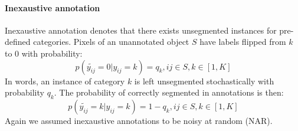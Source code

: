 \noindent
\paragraph{Inexaustive annotation}
Inexaustive annotation denotes that there exists unsegmented instances for pre-defined categories.
Pixels of an unannotated object $S$ have labels flipped from $k$ to $0$ with probability:
$$p(\tilde{y_{ij}}=0\vert y_{ij}=k) = q_k, ij \in S, k \in [1,K]$$
In words, an instance of category $k$ is left unsegmented stochastically with probability $q_k$.
The probability of correctly segmented in annotations is then:
$$p(\tilde{y_{ij}}=k\vert y_{ij}=k) = 1-q_k, ij \in S, k \in [1,K]$$
Again we assumed inexaustive annotations to be noisy at random (NAR).






